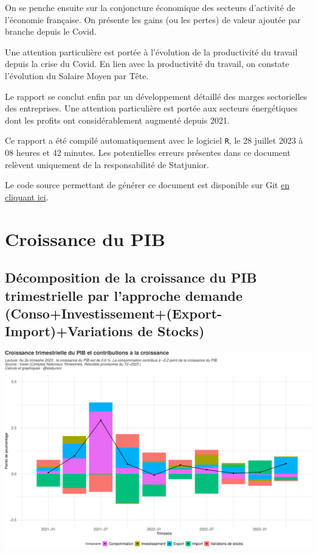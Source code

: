 \documentclass[
  paper=a4,
  ,captions=tableheading
]{scrartcl}
\begin{document}
On se penche ensuite sur la conjoncture économique des secteurs
d'activité de l'économie française. On présente les gains (ou les
pertes) de valeur ajoutée par branche depuis le Covid.

Une attention particulière est portée à l'évolution de la productivité
du travail depuis la crise du Covid. En lien avec la productivité du
travail, on constate l'évolution du Salaire Moyen par Tête.

Le rapport se conclut enfin par un développement détaillé des marges
sectorielles des entreprises. Une attention particulière est portée aux
secteurs énergétiques dont les profits ont considérablement augmenté
depuis 2021.

Ce rapport a été compilé automatiquement avec le logiciel \texttt{R}, le
28 juillet 2023 à 08 heures et 42 minutes. Les potentielles erreurs
présentes dans ce document relèvent uniquement de la responsabilité de
Statjunior.

Le code source permettant de générer ce document est disponible sur Git
\href{https://github.com/statjunior/Statjunior/tree/main/Conjoncture\%20-\%20comptes\%20trimestriels/}{en
cliquant ici}.

\newpage

\hypertarget{croissance-du-pib}{%
\section{Croissance du PIB}\label{croissance-du-pib}}

\hypertarget{duxe9composition-de-la-croissance-du-pib-trimestrielle-par-lapproche-demande-consoinvestissementexport-importvariations-de-stocks}{%
\subsection{Décomposition de la croissance du PIB trimestrielle par
l'approche demande (Conso+Investissement+(Export-Import)+Variations de
Stocks)}\label{duxe9composition-de-la-croissance-du-pib-trimestrielle-par-lapproche-demande-consoinvestissementexport-importvariations-de-stocks}}

\includegraphics{rapport_pdf_compte_branche_files/figure-latex/unnamed-chunk-2-1.pdf}
\end{document}
